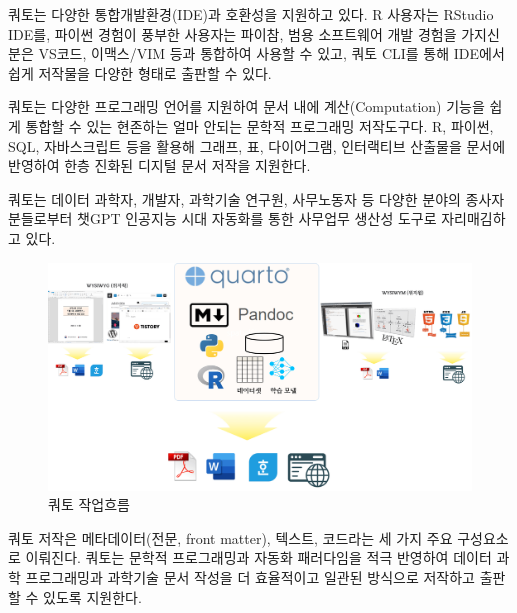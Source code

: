 \documentclass[
  letterpaper,
]{book}
\begin{document}
쿼토는 다양한 통합개발환경(IDE)과 호환성을 지원하고 있다. R 사용자는
RStudio IDE를, 파이썬 경험이 풍부한 사용자는 파이참, 범용 소프트웨어
개발 경험을 가지신 분은 VS코드, 이맥스/VIM 등과 통합하여 사용할 수 있고,
쿼토 CLI를 통해 IDE에서 쉽게 저작물을 다양한 형태로 출판할 수 있다.

쿼토는 다양한 프로그래밍 언어를 지원하여 문서 내에 계산(Computation)
기능을 쉽게 통합할 수 있는 현존하는 얼마 안되는 문학적 프로그래밍
저작도구다. R, 파이썬, SQL, 자바스크립트 등을 활용해 그래프, 표,
다이어그램, 인터랙티브 산출물을 문서에 반영하여 한층 진화된 디지털 문서
저작을 지원한다.

쿼토는 데이터 과학자, 개발자, 과학기술 연구원, 사무노동자 등 다양한
분야의 종사자분들로부터 챗GPT 인공지능 시대 자동화를 통한 사무업무
생산성 도구로 자리매김하고 있다.

\begin{figure}

{\centering \includegraphics{images/quarto-unification.png}

}

\caption{쿼토 작업흐름}

\end{figure}

쿼토 저작은 메타데이터(전문, front matter), 텍스트, 코드라는 세 가지
주요 구성요소로 이뤄진다. 쿼토는 문학적 프로그래밍과 자동화 패러다임을
적극 반영하여 데이터 과학 프로그래밍과 과학기술 문서 작성을 더
효율적이고 일관된 방식으로 저작하고 출판할 수 있도록 지원한다.
\end{document}
